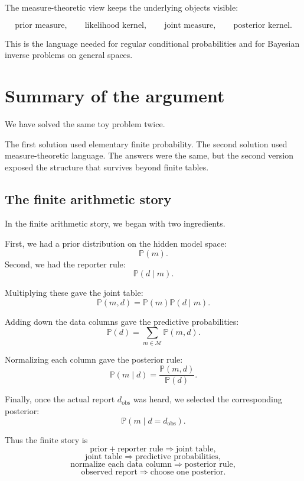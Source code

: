 \documentclass[11pt]{article}
\newcommand{\M}{\mathcal{M}}
\newcommand{\dobs}{d_{\mathrm{obs}}}
\begin{document}
The measure-theoretic view keeps the underlying objects visible:

\[
    \text{prior measure},
    \qquad
    \text{likelihood kernel},
    \qquad
    \text{joint measure},
    \qquad
    \text{posterior kernel}.
\]

This is the language needed for regular conditional probabilities and for Bayesian inverse problems on general spaces.

\section{Summary of the argument}
\label{sec:summary}

We have solved the same toy problem twice.

The first solution used elementary finite probability. The second solution used measure-theoretic language. The answers were the same, but the second version exposed the structure that survives beyond finite tables.

\subsection{The finite arithmetic story}

In the finite arithmetic story, we began with two ingredients.

First, we had a prior distribution on the hidden model space:
\[
    \mathbb{P}(m).
\]
Second, we had the reporter rule:
\[
    \mathbb{P}(d\mid m).
\]

Multiplying these gave the joint table:
\[
    \mathbb{P}(m,d)
    =
    \mathbb{P}(m)\mathbb{P}(d\mid m).
\]

Adding down the data columns gave the predictive probabilities:
\[
    \mathbb{P}(d)
    =
    \sum_{m\in\M}\mathbb{P}(m,d).
\]

Normalizing each column gave the posterior rule:
\[
    \mathbb{P}(m\mid d)
    =
    \frac{\mathbb{P}(m,d)}{\mathbb{P}(d)}.
\]

Finally, once the actual report \(\dobs\) was heard, we selected the corresponding posterior:
\[
    \mathbb{P}(m\mid d=\dobs).
\]

Thus the finite story is
\[
    \text{prior}
    +
    \text{reporter rule}
    \Longrightarrow
    \text{joint table},
\]
\[
    \text{joint table}
    \Longrightarrow
    \text{predictive probabilities},
\]
\[
    \text{normalize each data column}
    \Longrightarrow
    \text{posterior rule},
\]
\[
    \text{observed report}
    \Longrightarrow
    \text{choose one posterior}.
\]
\end{document}
